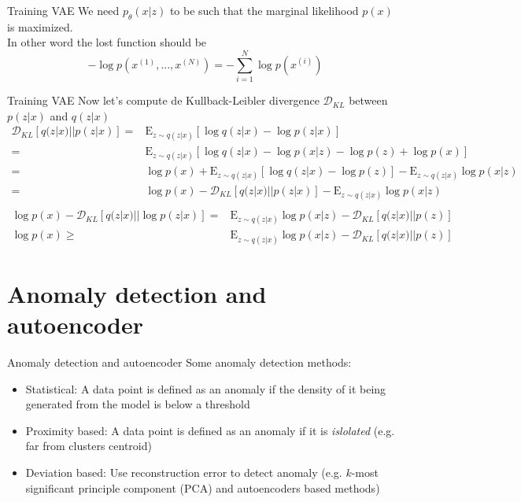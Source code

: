 \documentclass{beamer}
\newcommand{\kldiv}{\mathcal{D}_{KL}}
\newcommand{\E}{\mathrm{E}}
\begin{document}
\begin{frame}{Training VAE}
We need $p_\theta(x|z)$ to be such that the marginal likelihood $p(x)$ is maximized. \\

In other word the lost function should be
\[
	-\log p(x^{(1)},...,x^{(N)}) = -\sum_{i=1}^N \log p(x^{(i)})
\]
\end{frame}

\begin{frame}{Training VAE}
Now let's compute de Kullback-Leibler divergence $\kldiv$ between $p(z|x)$ and $q(z|x)$
\scriptsize
\begin{equation*}
\begin{split}
	\kldiv[q(z|x)||p(z|x)] 
	=& \E_{z\sim q(z|x)}[ \log q(z|x) - \log p(z|x)]\\
	=& \E_{z\sim q(z|x)}[ \log q(z|x) - \log p(x|z) - \log p(z) + \log p(x)]\\
	=& \log p(x) + \E_{z\sim q(z|x)}[ \log q(z|x)  - \log p(z)] - \E_{z\sim q(z|x)}\log p(x|z)\\
	=& \log p(x) - \kldiv[q(z|x)||p(z|x)] - \E_{z\sim q(z|x)}\log p(x|z)\\
\end{split}
\end{equation*}
\footnotesize
\begin{equation}
\begin{split}
	\log p(x) - \kldiv[q(z|x)||\log p(z|x)] =& \E_{z\sim q(z|x)}\log p(x|z)- \kldiv[q(z|x)||p(z)]\\
	\log p(x)  \geq& \E_{z\sim q(z|x)}\log p(x|z)- \kldiv[q(z|x)||p(z)]
\end{split}
\end{equation}
\end{frame}

\section{Anomaly detection and autoencoder}
\begin{frame}{Anomaly detection and autoencoder}
Some anomaly detection methods:
\begin{itemize}
	\item Statistical: A data point is defined as an anomaly if the density of it being generated from the model is below a threshold
	\item Proximity based: A data point is defined as an anomaly if it is \textit{islolated} (e.g. far from clusters centroid)
	\item Deviation based: Use reconstruction error to detect anomaly (e.g. $k$-most significant principle component (PCA) and autoencoders based methods)
\end{itemize}
\end{frame}
\end{document}
